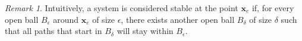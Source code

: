 \documentclass{article}
\newcommand{\B}[1]{\boldsymbol{#1}}
\DeclarePairedDelimiter\norm{\lVert}{\rVert}%
\newtheorem{theorem}{Theorem}[section]
\theoremstyle{definition}
\newtheorem{definition}{Definition}[section]
\theoremstyle{remark}
\newtheorem*{remark}{Remark}
\begin{document}
\begin{remark}
  \label{OpenBall}
  Intuitively, a system is considered stable at the point $\B{x}_e$ if, for every open ball $B_\epsilon$
  around $\B{x}_e$ of size $\epsilon$, there exists another open ball $B_\delta$ of size $\delta$ such
  that all paths that start in $B_\delta$ will stay within $B_\epsilon$.
\end{remark}




\end{document}
